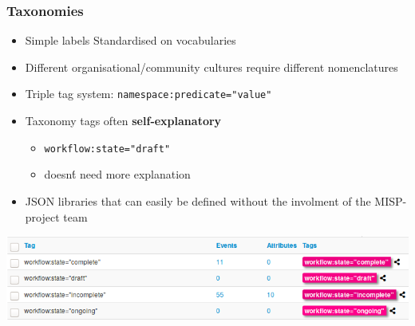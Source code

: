 \begin{frame}
    \frametitle{Taxonomies}
    \begin{itemize}
        \item Simple labels Standardised on vocabularies
        \item Different organisational/community cultures require different nomenclatures
        \item Triple tag system: \texttt{namespace:predicate="value"}
        \item Taxonomy tags often {\bf self-explanatory}
        \begin{itemize}
            \item \texttt{workflow:state="draft"}
            \item doesn\'t need more explanation
        \end{itemize}
        \item JSON libraries that can easily be defined without the involment of the MISP-project team
    \end{itemize}
    \includegraphics[width=1.0\linewidth]{pictures/taxonomy-workflow.png}
\end{frame}

